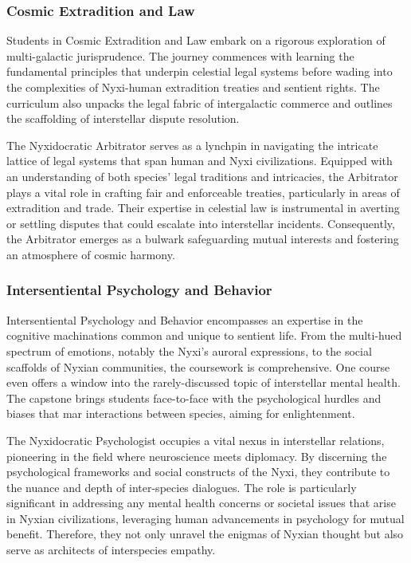 \subsubsection{Cosmic Extradition and Law}
Students in Cosmic Extradition and Law embark on a rigorous exploration of
multi-galactic jurisprudence. The journey commences with learning the
fundamental principles that underpin celestial legal systems before wading into
the complexities of Nyxi-human extradition treaties and sentient rights. The
curriculum also unpacks the legal fabric of intergalactic commerce and outlines
the scaffolding of interstellar dispute resolution.

The Nyxidocratic Arbitrator serves as a lynchpin in navigating the intricate
lattice of legal systems that span human and Nyxi civilizations. Equipped with
an understanding of both species' legal traditions and intricacies, the
Arbitrator plays a vital role in crafting fair and enforceable treaties,
particularly in areas of extradition and trade. Their expertise in celestial
law is instrumental in averting or settling disputes that could escalate into
interstellar incidents. Consequently, the Arbitrator emerges as a bulwark
safeguarding mutual interests and fostering an atmosphere of cosmic harmony.

\subsubsection{Intersentiental Psychology and Behavior}
Intersentiental Psychology and Behavior encompasses an expertise in the
cognitive machinations common and unique to sentient life. From the multi-hued
spectrum of emotions, notably the Nyxi's auroral expressions, to the social
scaffolds of Nyxian communities, the coursework is comprehensive. One course
even offers a window into the rarely-discussed topic of interstellar mental
health. The capstone brings students face-to-face with the psychological
hurdles and biases that mar interactions between species, aiming for
enlightenment.

The Nyxidocratic Psychologist occupies a vital nexus in interstellar relations,
pioneering in the field where neuroscience meets diplomacy. By discerning the
psychological frameworks and social constructs of the Nyxi, they contribute to
the nuance and depth of inter-species dialogues. The role is particularly
significant in addressing any mental health concerns or societal issues that
arise in Nyxian civilizations, leveraging human advancements in psychology for
mutual benefit. Therefore, they not only unravel the enigmas of Nyxian thought
but also serve as architects of interspecies empathy.

